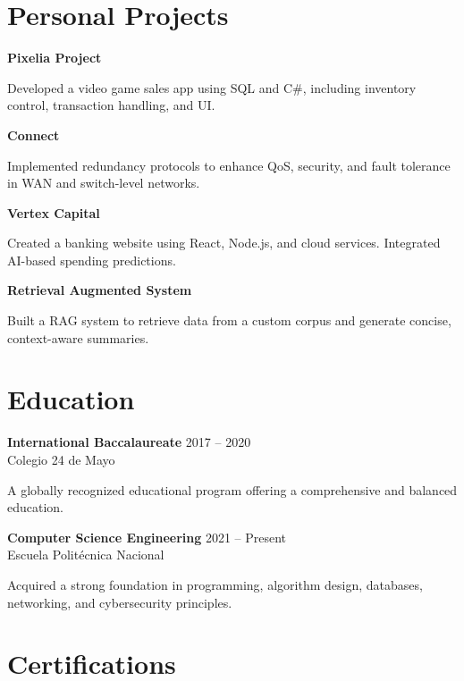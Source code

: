 \documentclass[11pt,a4paper]{article}
\newenvironment{uniformindent}{%
  \begin{list}{}{%
    \setlength{\leftmargin}{2em}
    \setlength{\rightmargin}{0pt}
    \setlength{\topsep}{0pt}
    \setlength{\partopsep}{0pt}
    \setlength{\parsep}{0pt}
    \setlength{\itemsep}{0pt}
  }
  \item[]
}{%
  \end{list}
}
\newenvironment{indentedpar}{%
  \begin{list}{}{%
    \setlength{\leftmargin}{2em}
    \setlength{\rightmargin}{0pt}
    \setlength{\itemsep}{0pt}
    \setlength{\parsep}{0pt}
    \setlength{\topsep}{0pt}
  }
  \item[]
}{%
  \end{list}
}
\begin{document}
\begin{uniformindent}
\section*{Personal Projects}

\textbf{Pixelia Project}
\begin{indentedpar}
Developed a video game sales app using SQL and C\#, including inventory control, transaction handling, and UI.
\end{indentedpar}

\textbf{Connect}
\begin{indentedpar}
Implemented redundancy protocols to enhance QoS, security, and fault tolerance in WAN and switch-level networks.
\end{indentedpar}

\textbf{Vertex Capital}
\begin{indentedpar}
Created a banking website using React, Node.js, and cloud services. Integrated AI-based spending predictions.
\end{indentedpar}

\textbf{Retrieval Augmented System}
\begin{indentedpar}
Built a RAG system to retrieve data from a custom corpus and generate concise, context-aware summaries.
\end{indentedpar}
\section*{Education}

\textbf{International Baccalaureate} \hfill 2017 -- 2020\\
Colegio 24 de Mayo\\
\begin{indentedpar}
A globally recognized educational program offering a comprehensive and balanced education.\\
\end{indentedpar}

\textbf{Computer Science Engineering} \hfill 2021 -- Present\\
Escuela Politécnica Nacional\\
\begin{indentedpar}
Acquired a strong foundation in programming, algorithm design, databases, networking, and cybersecurity principles.
\end{indentedpar}

\section*{Certifications}


\end{uniformindent}
\end{document}
